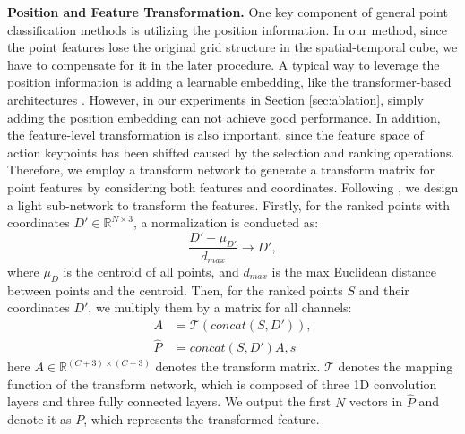 \documentclass[journal]{IEEEtran}
\begin{document}
\textbf{Position and Feature Transformation.}
One key component of general point classification methods is utilizing the position information.
In our method, since the point features lose the original grid structure in the spatial-temporal cube, we have to compensate for it in the later procedure.
A typical way to leverage the position information is adding a learnable embedding, like the transformer-based architectures \cite{vaswani2017attention,dosovitskiy2020image}.
However, in our experiments in Section \ref{sec:ablation}, simply adding the position embedding can not achieve good performance.
In addition, the feature-level transformation is also important, since the feature space of action keypoints has been shifted caused by the selection and ranking operations.
Therefore, we employ a transform network to generate a transform matrix for point features by considering both features and coordinates. 
Following \cite{qi2017pointnet, qi2017pointnet++}, we design a light sub-network to transform the features.
Firstly, for the ranked points with coordinates $D'\in\mathbb{R}^{N\times 3}$, a normalization is conducted as:
\begin{equation}
	\frac{D'-\mu_{D'}}{d_{max}}\rightarrow D',
\end{equation}
where $\mu_D$ is the centroid of all points, and $d_{max}$ is the max Euclidean distance between points and the centroid.
Then, for the ranked points $S$ and their coordinates $D'$, we multiply them by a matrix for all channels:
\begin{align}
	A &= \mathcal{T}(concat(S,D')), \\
	\hat{P} &= concat(S,D')A,s
\end{align}
here $A\in\mathbb{R}^{(C+3)\times(C+3)}$ denotes the transform matrix.
$\mathcal{T}$ denotes the mapping function of the transform network, which is composed of three 1D convolution layers and three fully connected layers.
We output the first $N$ vectors in $\hat{P}$ and denote it as $\tilde{P}$, which represents the transformed feature.
\end{document}
